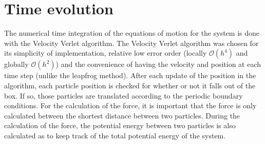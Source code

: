 \section{Time evolution}
The numerical time integration of the equations of motion for the system is done with the Velocity Verlet algorithm. The Velocity Verlet algorithm was chosen for its simplicity of implementation, relative low error order (locally $\mathcal{O}(h^4)$ and globally $\mathcal{O}(h^2)$) and the convenience of having the velocity and position at each time step (unlike the leapfrog method).
After each update of the position in the algorithm, each particle position is checked for whether or not it falls out of the box. If so, those particles are translated according to the periodic boundary conditions. For the calculation of the force, it is important that the force is only calculated between the shortest distance between two particles. During the calculation of the force, the potential energy between two particles is also calculated as to keep track of the total potential energy of the system.
